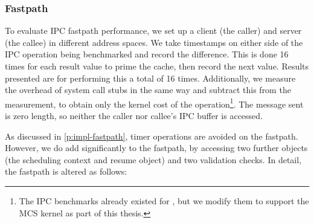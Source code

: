 \subsubsection{Fastpath}

To evaluate IPC fastpath performance, we set up a client (the caller) and server (the callee) in different
address spaces. We take timestamps on either side of the IPC operation being benchmarked and record
the difference. This is done 16 times for each result value to prime the cache, then record the next
value. Results presented are for performing this a total of 16 times. Additionally, we measure the
overhead of system call stubs in the same way and subtract this from the measurement, to obtain
only the kernel cost of the operation\footnote{The \gls{IPC} benchmarks already existed for
 \selfour, but we modify them to support the \gls{MCS} kernel as part of this thesis.}.
   The message sent is zero length, so neither the caller nor callee's \gls{IPC} buffer is accessed.

As discussed in \cref{p:impl-fastpath}, timer operations are avoided on the fastpath. However, we do
add significantly to the \call fastpath, by accessing two further objects (the scheduling context
and resume object) and two validation checks. In detail, the \call fastpath is altered as follows:

